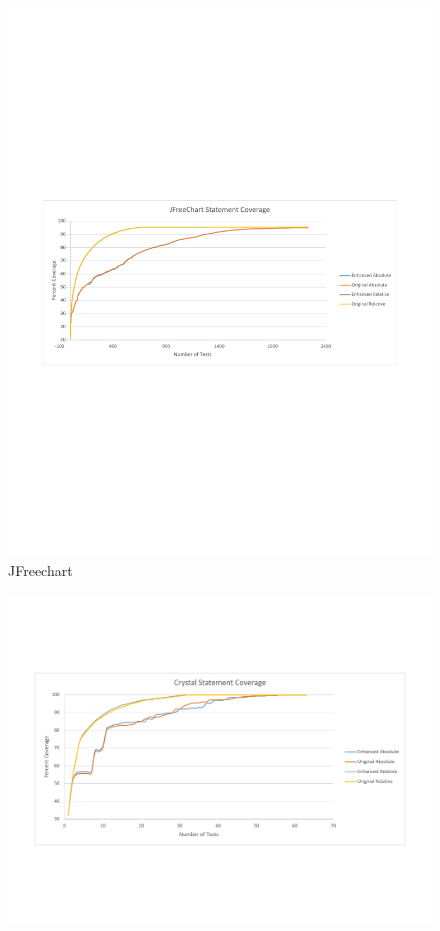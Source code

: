 \begin{figure}[t]
\begin{minipage}[b]{\linewidth}
\includegraphics[scale=0.46]{jfreechart-coverage-figure}
JFreechart
\end{minipage}
\begin{minipage}[b]{\linewidth}
\centering
\includegraphics[scale=0.35]{crystal-coverage-figure}

\end{minipage}
\end{figure}
